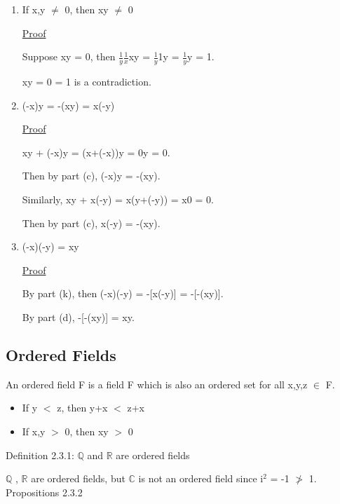 \begin{enumerate}[label=(\alph*), leftmargin=2cm]
		\item If x,y $\not =$ 0, then xy $\not =$ 0

			{ \color{magenta} \underline{Proof} } 
		
				Suppose xy = 0, then $\frac{1}{y}\frac{1}{x}$xy
				= $\frac{1}{y}$1y = $\frac{1}{y}$y = 1.

				xy = 0 = 1 is a contradiction.
	
		\item (-x)y = -(xy) = x(-y)

			{ \color{magenta} \underline{Proof} } 
		
				xy + (-x)y = (x+(-x))y = 0y = 0.

				Then by part (c), (-x)y = -(xy).

				Similarly, xy + x(-y) = x(y+(-y)) = x0 = 0.
	
				Then by part (c), x(-y) = -(xy).

		\item (-x)(-y) = xy

			{ \color{magenta} \underline{Proof} } 
		
				By part (k), then (-x)(-y) = -[x(-y)] = -[-(xy)].

				By part (d), -[-(xy)] = xy.
	\end{enumerate}





\subsection{Ordered Fields}

	\qquad An ordered field F is a field F which is also an ordered set for all x,y,z $\in$ F.

	\begin{itemize}[leftmargin=2cm]
		\item If y $<$ z, then y+x $<$ z+x
	
		\item If x,y $>$ 0, then xy $>$ 0
	\end{itemize}

{ \color{blue} Definition 2.3.1: $ \mathbb{Q} $ and $ \mathbb{R} $ are ordered fields } 

	\qquad $ \mathbb{Q} $ , $ \mathbb{R} $ are ordered fields,
	but $ \mathbb{C} $ is not an ordered field since i$^2$ = -1 $\not >$ 1. \\

{ \color{blue} Propositions 2.3.2} 

